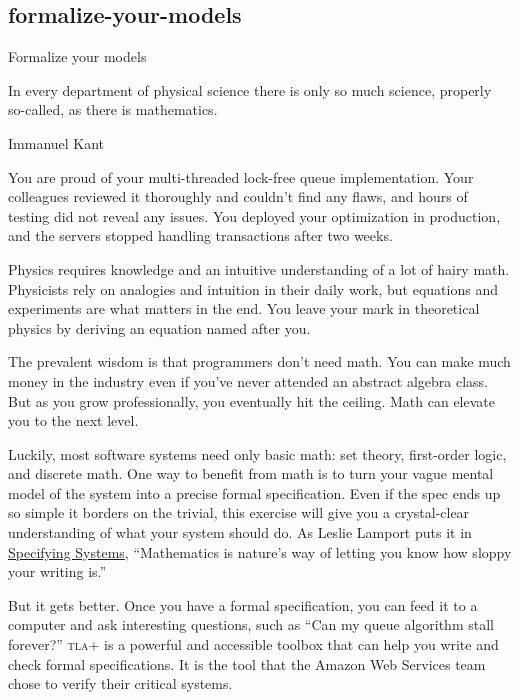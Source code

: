 \documentclass{article}
\begin{document}
\subsection{formalize-your-models}{Formalize your models}

\epigraph{
  In every department of physical science there is only so much science, properly so-called, as there is mathematics.
}{Immanuel Kant}



You are proud of your multi-threaded lock-free queue implementation.
Your colleagues reviewed it thoroughly and couldn't find any flaws, and hours of testing did not reveal any issues.
You deployed your optimization in production, and the servers stopped handling transactions after two weeks.

Physics requires knowledge and an intuitive understanding of a lot of hairy math.
Physicists rely on analogies and intuition in their daily work, but equations and experiments are what matters in the end.
You leave your mark in theoretical physics by deriving an equation named after you.

The prevalent wisdom is that programmers don't need math.
You can make much money in the industry even if you've never attended an abstract algebra class.
But as you grow professionally, you eventually hit the ceiling.
Math can elevate you to the next level.

Luckily, most software systems need only basic math: set theory, first-order logic, and discrete math.
One way to benefit from math is to turn your vague mental model of the system into a precise formal specification.
Even if the spec ends up so simple it borders on the trivial, this exercise will give you a crystal-clear understanding of what your system should do.
As Leslie Lamport puts it in \href{https://www.goodreads.com/book/show/2159127.Specifying_Systems}{Specifying Systems},
``Mathematics is nature's way of letting you know how sloppy your writing is.''

But it gets better.
Once you have a formal specification, you can feed it to a computer and ask interesting questions, such as ``Can my queue algorithm stall forever?''
\textsc{tla+} is a powerful and accessible toolbox that can help you write and check formal specifications.
It is the tool that the Amazon Web Services team chose to verify their critical systems.
\end{document}
